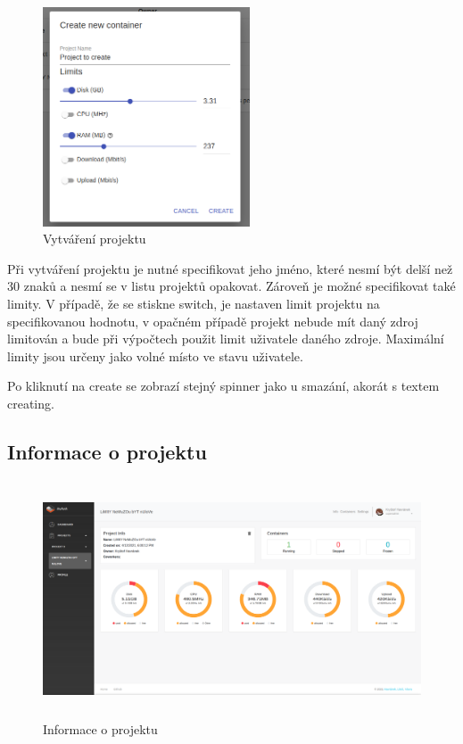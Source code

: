 \documentclass[a4paper,oneside,12pt]{report}
\begin{document}
\begin{figure}[h]
	\centering
	\includegraphics[height=6.5cm]{../img/createPro.png}
	\caption[Vytváření projekt, vlastní tvorba]{Vytváření projektu}
	\label{fig:createPro}
\end{figure}

Při vytváření projektu je nutné specifikovat jeho jméno, které nesmí být delší než 30 znaků a nesmí se v listu projektů opakovat.
Zároveň je možné specifikovat také limity.
V případě, že se stiskne switch, je nastaven limit projektu na specifikovanou hodnotu, v opačném případě projekt nebude mít daný zdroj limitován a bude při výpočtech použit limit uživatele daného zdroje.
Maximální limity jsou určeny jako volné místo ve stavu uživatele.


Po kliknutí na create se zobrazí stejný spinner jako u smazání, akorát s textem creating.

\subsection{Informace o projektu}

\begin{figure}[h]
	\centering
	\includegraphics[height=7cm]{../img/proinfo.png}
	\caption[Informace o projektu, vlastní tvorba]{Informace o projektu}
	\label{fig:proinfo}
\end{figure}
\end{document}
